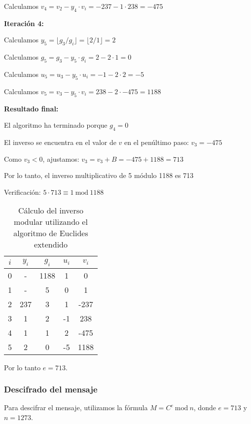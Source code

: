{Calculamos $v_4 = v_2 - y_4 \cdot v_i = -237 - 1 \cdot 238 = -475$



\textbf{Iteración 4:}

Calculamos $y_5 = \lfloor g_3 / g_i \rfloor = \lfloor 2 / 1 \rfloor = 2$

Calculamos $g_5 = g_3 - y_5 \cdot g_i = 2 - 2 \cdot 1 = 0$

Calculamos $u_5 = u_3 - y_5 \cdot u_i = -1 - 2 \cdot 2 = -5$

Calculamos $v_5 = v_3 - y_5 \cdot v_i = 238 - 2 \cdot -475 = 1188$



\textbf{Resultado final:}

El algoritmo ha terminado porque $g_4 = 0$

El inverso se encuentra en el valor de $v$ en el penúltimo paso: $v_3 = -475$

Como $v_3 < 0$, ajustamos: $v_3 = v_3 + B = -475 + 1188 = 713$

Por lo tanto, el inverso multiplicativo de 5 módulo 1188 es 713

Verificación: $5 \cdot 713 \equiv 1 ~\text{mod}~1188$

\begin{table}[h]
\centering
\begin{tabular}{|c|c|c|c|c|}
\hline
$i$ & $y_i$ & $g_i$ & $u_i$ & $v_i$ \\ \hline
0 & - & 1188 & 1 & 0 \\ \hline
1 & - & 5 & 0 & 1 \\ \hline
2 & 237 & 3 & 1 & -237 \\ \hline
3 & 1 & 2 & -1 & 238 \\ \hline
4 & 1 & 1 & 2 & -475 \\ \hline
5 & 2 & 0 & -5 & 1188 \\ \hline
\end{tabular}
\caption{Cálculo del inverso modular utilizando el algoritmo de Euclides extendido}
\label{tab:euclides}
\end{table}

Por lo tanto $e = 713$.

\subsubsection{Descifrado del mensaje}

Para descifrar el mensaje, utilizamos la fórmula $M = C^e ~\text{mod}~ n$, donde $e = 713$ y $n = 1273$.

}
